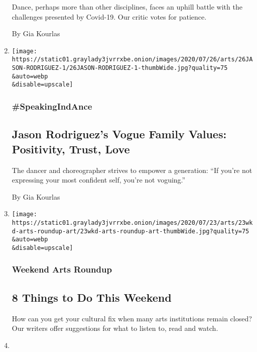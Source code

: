 \begin{enumerate}
  Dance, perhaps more than other disciplines, faces an uphill battle
  with the challenges presented by Covid-19. Our critic votes for
  patience.

  By Gia Kourlas
\item
  \href{/2020/07/24/arts/dance/jason-rodriguez-vogue-pose.html}{}

  \texttt{[image: https://static01.graylady3jvrrxbe.onion/images/2020/07/26/arts/26JASON-RODRIGUEZ-1/26JASON-RODRIGUEZ-1-thumbWide.jpg?quality=75\\\&auto=webp\\\&disable=upscale]}

  \hypertarget{speakingindance-1}{%
  \subsubsection{\#SpeakingIndAnce}\label{speakingindance-1}}

  \hypertarget{jason-rodriguezs-vogue-family-values-positivity-trust-love}{%
  \subsection{Jason Rodriguez's Vogue Family Values: Positivity, Trust,
  Love}\label{jason-rodriguezs-vogue-family-values-positivity-trust-love}}

  The dancer and choreographer strives to empower a generation: ``If
  you're not expressing your most confident self, you're not voguing.''

  By Gia Kourlas
\item
  \href{/2020/07/23/arts/things-to-do-weekend-coronavirus.html}{}

  \texttt{[image: https://static01.graylady3jvrrxbe.onion/images/2020/07/23/arts/23wkd-arts-roundup-art/23wkd-arts-roundup-art-thumbWide.jpg?quality=75\\\&auto=webp\\\&disable=upscale]}

  \hypertarget{weekend-arts-roundup}{%
  \subsubsection{Weekend Arts Roundup}\label{weekend-arts-roundup}}

  \hypertarget{8-things-to-do-this-weekend}{%
  \subsection{8 Things to Do This
  Weekend}\label{8-things-to-do-this-weekend}}

  How can you get your cultural fix when many arts institutions remain
  closed? Our writers offer suggestions for what to listen to, read and
  watch.
\item
  \href{/2020/07/21/arts/dance/ayodele-casel-diary-of-a-tap-dancer.html}{}


\end{enumerate}
